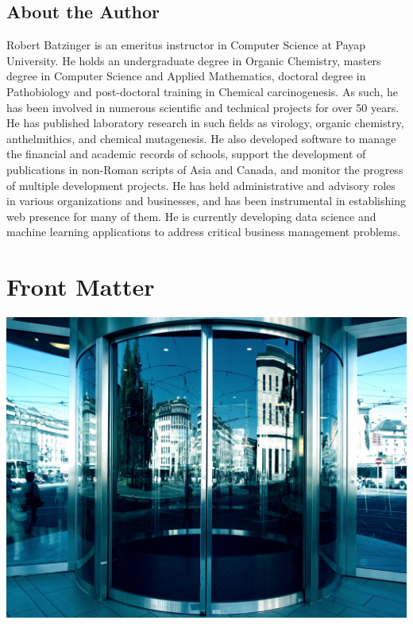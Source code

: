 \documentclass[]{book}
\begin{document}
\hypertarget{about-the-author}{%
\section*{About the Author}\label{about-the-author}}

Robert Batzinger is an emeritus instructor in Computer Science at Payap University. He holds an undergraduate degree in Organic Chemistry, masters degree in Computer Science and Applied Mathematics, doctoral degree in Pathobiology and post-doctoral training in Chemical carcinogenesis. As such, he has been involved in numerous scientific and technical projects for over 50 years. He has published laboratory research in such fields as virology, organic chemistry, anthelmithics, and chemical mutagenesis. He also developed software to manage the financial and academic records of schools, support the development of publications in non-Roman scripts of Asia and Canada, and monitor the progress of multiple development projects. He has held administrative and advisory roles in various organizations and businesses, and has been instrumental in establishing web presence for many of them. He is currently developing data science and machine learning applications to address critical business management problems.

\hypertarget{front-matter}{%
\chapter*{Front Matter}\label{front-matter}}

\begin{center}\includegraphics[width=0.9\linewidth]{images/door} \end{center}
\end{document}
